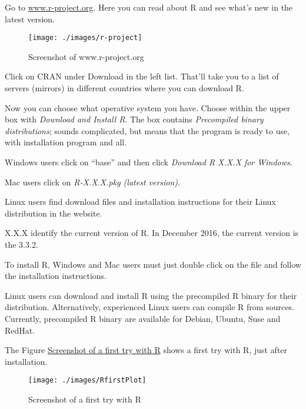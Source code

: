 \documentclass[]{book}
\begin{document}
Go to \href{http://www.r-project.org/}{www.r-project.org}. Here you can
read about R and see what's new in the latest version.

\begin{figure}

{\centering \texttt{[image: ./images/r-project]} 

}

\caption{Screenshot of www.r-project.org}\label{fig:g1}
\end{figure}

Click on CRAN under Download in the left list. That'll take you to a
list of servers (mirrors) in different countries where you can download
R.

Now you can choose what operative system you have. Choose within the
upper box with \emph{Download and Install R}. The box contains
\emph{Precompiled binary distributions}; sounds complicated, but means
that the program is ready to use, with installation program and all.

Windows users click on ``base'' and then click \emph{Download R X.X.X
for Windows}.

Mac users click on \emph{R-X.X.X.pkg (latest version)}.

Linux users find download files and installation instructions for their
Linux distribution in the website.

X.X.X identify the current version of R. In December 2016, the current
version is the 3.3.2.

To install R, Windows and Mac users must just double click on the file
and follow the installation instructions.

Linux users can download and install R using the precompiled R binary
for their distribution. Alternatively, experienced Linux users can
compile R from sources. Currently, precompiled R binary are available
for Debian, Ubuntu, Suse and RedHat.

The Figure \protect\hyperlink{fig:ssFirsttry}{Screenshot of a first try
with R} shows a first try with R, just after installation.

\hypertarget{fig:ssFirsttry}{}
\begin{figure}

{\centering \texttt{[image: ./images/RfirstPlot]} 

}

\caption{Screenshot of a first try with R}\label{fig:g2}
\end{figure}
\end{document}
